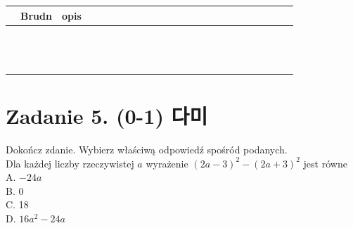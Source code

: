 \documentclass[10pt]{article}
\begin{document}
\begin{center}
\begin{tabular}{|c|c|c|c|c|c|c|c|c|c|c|c|c|c|c|c|c|c|c|c|c|c|c|c|}
\hline
 & Brudn & opis &  &  &  &  &  &  &  &  &  &  &  &  &  &  &  &  &  &  &  &  &  \\
\hline
 &  &  &  &  &  &  &  &  &  &  &  &  &  &  &  &  &  &  &  &  &  &  &  \\
\hline
 &  &  &  &  &  &  &  &  &  &  &  &  &  &  &  &  &  &  &  &  &  &  &  \\
\hline
 &  &  &  &  &  &  &  &  &  &  &  &  &  &  &  &  &  &  &  &  &  &  &  \\
\hline
 &  &  &  &  &  &  &  &  &  &  &  &  &  &  &  &  &  &  &  &  &  &  &  \\
\hline
 &  &  &  &  &  &  &  &  &  &  &  &  &  &  &  &  &  &  &  &  &  &  &  \\
\hline
 &  &  &  &  &  &  &  &  &  &  &  &  &  &  &  &  &  &  &  &  &  &  &  \\
\hline
 &  &  &  &  &  &  &  &  &  &  &  &  &  &  &  &  &  &  &  &  &  &  &  \\
\hline
 &  &  &  &  &  &  &  &  &  &  &  &  &  &  &  &  &  &  &  &  &  &  &  \\
\hline
 &  &  &  &  &  &  &  &  &  &  &  &  &  &  &  &  &  &  &  &  &  &  &  \\
\hline
 &  &  &  &  &  &  &  &  &  &  &  &  &  &  &  &  &  &  &  &  &  &  &  \\
\hline
 &  &  &  &  &  &  &  &  &  &  &  &  &  &  &  &  &  &  &  &  &  &  &  \\
\hline
 &  &  &  &  &  &  &  &  &  &  &  &  &  &  &  &  &  &  &  &  &  &  &  \\
\hline
 &  &  &  &  &  &  &  &  &  &  &  &  &  &  &  &  &  &  &  &  &  &  &  \\
\hline
\end{tabular}
\end{center}

\section*{Zadanie 5. (0-1) 다미}
Dokończ zdanie. Wybierz właściwą odpowiedź spośród podanych.\\
Dla każdej liczby rzeczywistej \(a\) wyrażenie \((2 a-3)^{2}-(2 a+3)^{2}\) jest równe\\
A. \(-24 a\)\\
B. 0\\
C. 18\\
D. \(16 a^{2}-24 a\)
\end{document}
